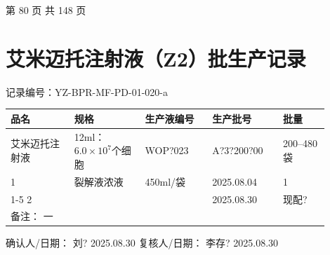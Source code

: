 \documentclass[UTF8,10pt,a4paper,fontset=fandol]{ctexart}
\newcommand{\fieldvalue}[1]{#1}
\newcommand{\handwritten}[1]{#1}
\begin{document}
\medskip

\begin{center}
第 80 页 共 148 页
\end{center}

\newpage

\section*{艾米迈托注射液（Z2）批生产记录}

\noindent
记录编号：YZ-BPR-MF-PD-01-020-a

\begin{tabular}{|p{0.18\linewidth}|p{0.20\linewidth}|p{0.19\linewidth}|p{0.20\linewidth}|p{0.13\linewidth}|}
\hline
品名 & 规格 & 生产液编号 & 生产批号 & 批量 \\
\hline
\fieldvalue{艾米迈托注射液}
&
\fieldvalue{12ml：$6.0\times10^{7}$个细胞}
&
\fieldvalue{\handwritten{WOP?023}}
&
\fieldvalue{\handwritten{A?3?200?00}}
&
\fieldvalue{200--480袋}
\\
\hline
1 &
\fieldvalue{裂解液浓液}
&
\fieldvalue{450ml/袋}
&
\fieldvalue{\handwritten{2025.08.04}}
&
\fieldvalue{\handwritten{1}}
\\
\cline{1-5}
2 &
&
&
\fieldvalue{\handwritten{2025.08.30}}
&
\fieldvalue{\handwritten{现配?}}
\\
\hline
\multicolumn{5}{|l|}{备注：\quad
\fieldvalue{\handwritten{一}}}\\
\hline
\end{tabular}

\vspace{0.4em}

\noindent
确认人/日期：
\fieldvalue{\handwritten{刘?}}
\quad
\fieldvalue{\handwritten{2025.08.30}}
\qquad
复核人/日期：
\fieldvalue{\handwritten{李存?}}
\quad
\fieldvalue{\handwritten{2025.08.30}}
\end{document}
